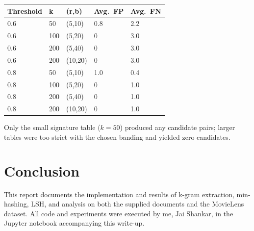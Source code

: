 \documentclass[12pt]{article}
\begin{document}
\begin{center}
\begin{tabular}{lllll}
\toprule
Threshold & k & (r,b) & Avg.~FP & Avg.~FN \\
\midrule
0.6 & 50  & (5,10) & 0.8 & 2.2 \\
0.6 &100  & (5,20) & 0   & 3.0 \\
0.6 &200  & (5,40) & 0   & 3.0 \\
0.6 &200  & (10,20)& 0   & 3.0 \\
0.8 & 50  & (5,10) & 1.0 & 0.4 \\
0.8 &100  & (5,20) & 0   & 1.0 \\
0.8 &200  & (5,40) & 0   & 1.0 \\
0.8 &200  & (10,20)& 0   & 1.0 \\
\bottomrule
\end{tabular}
\end{center}

Only the small signature table ($k=50$) produced any candidate pairs; larger tables were too
strict with the chosen banding and yielded zero candidates.

\section*{Conclusion}
This report documents the implementation and results of k-gram extraction, min-hashing,
LSH, and analysis on both the supplied documents and the MovieLens dataset.  All code and
experiments were executed by me, Jai Shankar, in the Jupyter notebook accompanying this
write-up.
\end{document}
